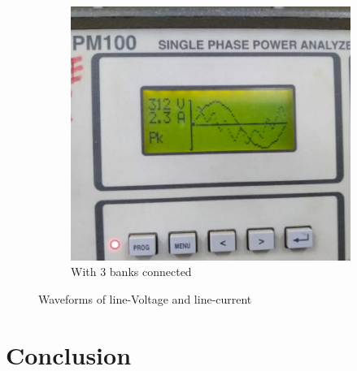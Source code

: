 \documentclass[12pt]{article}
\begin{document}
\begin{figure}[H]
\begin{subfigure}{0.3\linewidth}
               \centering
               \includegraphics[width = 0.85\linewidth]{LAB-1/3 bank.jpeg}
               \caption{With 3 banks connected}
          \end{subfigure} 
          \caption{Waveforms of line-Voltage and line-current}
       \end{figure}
       
       
    
    
  \section{Conclusion}
  
\end{document}

